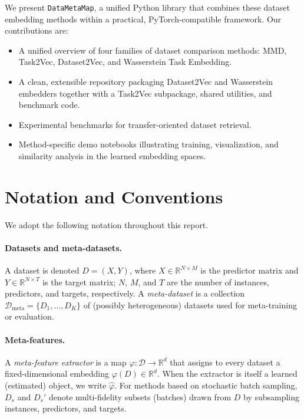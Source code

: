 \documentclass[peerreview]{IEEEtran}
\begin{document}
We present \texttt{DataMetaMap}, a unified Python library that
combines these dataset embedding methods within a practical,
PyTorch-compatible framework. Our contributions are:

\begin{itemize}
    \item A unified overview of four families of dataset comparison
    methods: MMD, Task2Vec, Dataset2Vec, and Wasserstein Task
    Embedding.
    \item A clean, extensible repository packaging Dataset2Vec and
    Wasserstein embedders together with a Task2Vec subpackage,
    shared utilities, and benchmark code.
    \item Experimental benchmarks for transfer-oriented dataset
    retrieval.
    \item Method-specific demo notebooks illustrating training,
    visualization, and similarity analysis in the learned embedding
    spaces.
\end{itemize}

\section{Notation and Conventions}
We adopt the following notation throughout this report.

\paragraph{Datasets and meta-datasets.}
A dataset is denoted $D = (X, Y)$, where
$X \in \mathbb{R}^{N \times M}$ is the predictor matrix and
$Y \in \mathbb{R}^{N \times T}$ is the target matrix; $N$, $M$, and
$T$ are the number of instances, predictors, and targets,
respectively. A \emph{meta-dataset} is a collection
$\mathcal{D}_{\mathrm{meta}} = \{D_1, \dots, D_K\}$ of (possibly
heterogeneous) datasets used for meta-training or evaluation.

\paragraph{Meta-features.}
A \emph{meta-feature extractor} is a map
$\varphi : \mathcal{D} \to \mathbb{R}^{d}$ that assigns to every
dataset a fixed-dimensional embedding $\varphi(D) \in \mathbb{R}^{d}$.
When the extractor is itself a learned (estimated) object, we write
$\hat{\varphi}$. For methods based on stochastic batch sampling,
$D_s$ and $D_s'$ denote multi-fidelity subsets (batches) drawn from
$D$ by subsampling instances, predictors, and targets.
\end{document}
